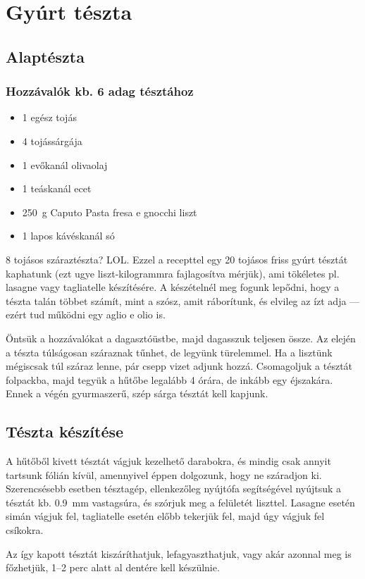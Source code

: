 \newpage
\section*{Gyúrt tészta}

\subsection*{Alaptészta}
\subsubsection*{Hozzávalók kb. 6 adag tésztához}
\begin{itemize}
    \item \num{1} egész tojás
    \item \num{4} tojássárgája
    \item \num{1} evőkanál olivaolaj
    \item \num{1} teáskanál ecet
    \item \qty{250}{\g} Caputo Pasta fresa e gnocchi liszt
    \item \num{1} lapos kávéskanál só
\end{itemize}

\num{8} tojásos száraztészta? LOL. Ezzel a recepttel egy \num{20} tojásos friss gyúrt tésztát kaphatunk (ezt ugye liszt-kilogrammra fajlagosítva mérjük), ami tökéletes pl. lasagne vagy tagliatelle készítésére. A készételnél meg fogunk lepődni, hogy a tészta talán többet számít, mint a szósz, amit ráborítunk, és elvileg az ízt adja --- ezért tud működni egy aglio e olio is.

Öntsük a hozzávalókat a dagasztóüstbe, majd dagasszuk teljesen össze. Az elején a tészta túlságosan száraznak tűnhet, de legyünk türelemmel. Ha a lisztünk mégiscsak túl száraz lenne, pár csepp vizet adjunk hozzá. Csomagoljuk a tésztát folpackba, majd tegyük a hűtőbe legalább \num{4} órára, de inkább egy éjszakára. Ennek a végén gyurmaszerű, szép sárga tésztát kell kapjunk.~\cite{szell_gyurt_teszta}

\subsection*{Tészta készítése}
A hűtőből kivett tésztát vágjuk kezelhető darabokra, és mindig csak annyit tartsunk fólián kívül, amennyivel éppen dolgozunk, hogy ne száradjon ki. Szerencsésebb esetben tésztagép, ellenkezőleg nyújtófa segítségével nyújtsuk a tésztát kb. \qty{0.9}{\mm} vastagsúra, és szórjuk meg a felületét liszttel. Lasagne esetén simán vágjuk fel, tagliatelle esetén előbb tekerjük fel, majd úgy vágjuk fel csíkokra.

Az így kapott tésztát kiszáríthatjuk, lefagyaszthatjuk, vagy akár azonnal meg is főzhetjük, \numrange{1}{2} perc alatt al dentére kell készülnie.

